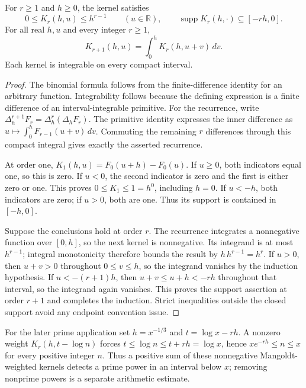 \begin{lemma}
\label{kernel:positivity-support}
\leanok
For $r\geq1$ and $h\geq0$, the kernel satisfies
\[
 0\leq K_r(h,u)\leq h^{r-1}\qquad(u\in\mathbb R),
 \qquad \operatorname{supp}K_r(h,\cdot)\subseteq[-rh,0].
\]
For all real $h,u$ and every integer $r\geq1$,
\[
 K_{r+1}(h,u)=\int_0^hK_r(h,u+v)\,dv.
\]
Each kernel is integrable on every compact interval.
\end{lemma}
\begin{proof}
The binomial formula follows from the finite-difference identity for
an arbitrary function.  Integrability follows because the defining
expression is a finite difference of an interval-integrable primitive.
For the recurrence, write
$\Delta_h^{r+1}F_r=\Delta_h^r(\Delta_hF_r)$.
The primitive identity expresses the inner difference as
$u\mapsto\int_0^hF_{r-1}(u+v)\,dv$.
Commuting the remaining $r$ differences through this compact integral
gives exactly the asserted recurrence.

At order one,
$K_1(h,u)=F_0(u+h)-F_0(u)$.
If $u\geq0$, both indicators equal one, so this is zero.
If $u<0$, the second indicator is zero and the first is either zero
or one.  This proves $0\leq K_1\leq1=h^0$, including $h=0$.
If $u<-h$, both indicators are zero; if $u>0$, both are one.
Thus its support is contained in $[-h,0]$.

Suppose the conclusions hold at order $r$.
The recurrence integrates a nonnegative function over $[0,h]$, so the
next kernel is nonnegative.  Its integrand is at most $h^{r-1}$;
integral monotonicity therefore bounds the result by
$h\,h^{r-1}=h^r$.
If $u>0$, then $u+v>0$ throughout $0\leq v\leq h$, so the integrand
vanishes by the induction hypothesis.
If $u<-(r+1)h$, then $u+v\leq u+h<-rh$ throughout that interval,
so the integrand again vanishes.
This proves the support assertion at order $r+1$ and completes the
induction.  Strict inequalities outside the closed support avoid any
endpoint convention issue.
\end{proof}

For the later prime application set $h=x^{-1/3}$ and
$t=\log x-rh$.  A nonzero weight $K_r(h,t-\log n)$ forces
$t\leq\log n\leq t+rh=\log x$, hence
$xe^{-rh}\leq n\leq x$ for every positive integer $n$.
Thus a positive sum of these nonnegative Mangoldt-weighted kernels
detects a prime power in an interval below $x$; removing nonprime powers
is a separate arithmetic estimate.

